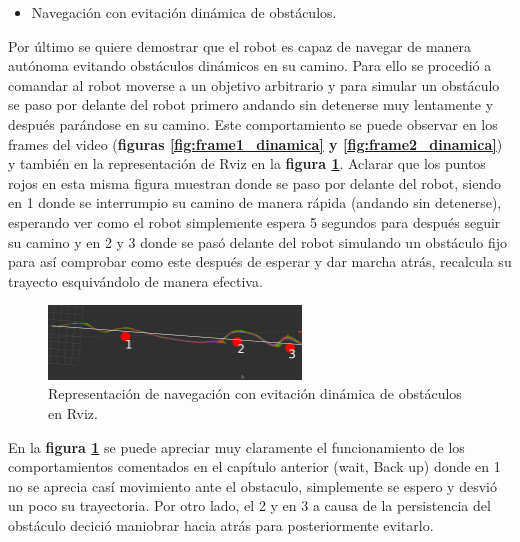 \newpage
\begin{itemize}
  \item Navegación con evitación dinámica de obstáculos.
\end{itemize}
Por último se quiere demostrar que el robot es capaz de navegar de manera autónoma evitando obstáculos dinámicos en su camino. Para ello se procedió a comandar al robot moverse 
a un objetivo arbitrario y para simular un obstáculo se paso por delante del robot primero andando sin detenerse muy lentamente y después parándose en su camino.
Este comportamiento se puede observar en los frames del video (\textbf{figuras \ref{fig:frame1_dinamica} y \ref{fig:frame2_dinamica}}) y también 
en la representación de Rviz en la \textbf{figura \ref{fig:navegacion_dinamica_rviz}}. Aclarar que los puntos rojos en esta misma figura muestran donde se paso por delante del robot, siendo en 1 donde se interrumpio su camino de manera rápida (andando sin detenerse), 
esperando ver como el robot simplemente espera 5 segundos para después seguir su camino y en 2 y 3 donde se pasó delante del robot simulando un obstáculo fijo para así comprobar como este después de esperar y dar marcha atrás, recalcula su 
trayecto esquivándolo de manera efectiva.


\begin{figure}[H]
    \centering
    \includegraphics[width=0.6\textwidth]{images/esquivando_nav.png}
    \caption{Representación de navegación con evitación dinámica de obstáculos en Rviz.}
    \label{fig:navegacion_dinamica_rviz}
\end{figure}

En la \textbf{figura \ref{fig:navegacion_dinamica_rviz}} se puede apreciar muy claramente el funcionamiento de los comportamientos comentados 
en el capítulo anterior (wait, Back up) donde en 1 no se aprecia casí movimiento ante el obstaculo, simplemente se espero y desvió un poco su trayectoria. Por otro lado, 
el 2 y en 3 a causa de la persistencia del obstáculo decició maniobrar hacia atrás para posteriormente evitarlo.

